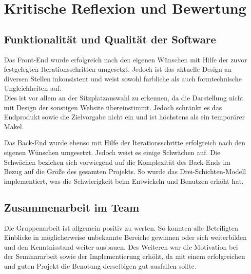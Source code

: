 \section{Kritische Reflexion und Bewertung}
\multipleauthorsection{\authorRF}{\authorEJ}

\subsection{Funktionalität und Qualität der Software}
\authorsection{\authorRF}

Das Front-End wurde erfolgreich nach den eigenen Wünschen mit Hilfe der zuvor festgelegten Iterationsschritten umgesetzt.
Jedoch ist das aktuelle Design an diversen Stellen inkonsistent und weist sowohl farbliche als auch formtechnische Ungleichheiten auf. \\
Dies ist vor allem an der Sitzplatzauswahl zu erkennen, da die Darstellung nicht mit Design der sonstigen Website übereinstimmt.
Jedoch schränkt es das Endprodukt sowie die Zielvorgabe nicht ein und ist höchstens als ein temporärer Makel.

Das Back-End wurde ebenso mit Hilfe der Iterationsschritte erfolgreich nach den eigenen Wünschen umgesetzt.
Jedoch weist es einige Schwächen auf.
Die Schwächen beziehen sich vorwiegend auf die Komplexität des Back-Ends im Bezug auf die Größe des gesamten Projekts.
So wurde das Drei-Schichten-Modell implementiert, was die Schwierigkeit beim Entwickeln und Benutzen erhöht hat.\\

\subsection{Zusammenarbeit im Team}
\multipleauthorsection{\authorRF}{\authorEJ}

Die Gruppenarbeit ist allgemein positiv zu werten. 
So konnten alle Beteiligten Einblicke in möglicherweise unbekannte Bereiche gewinnen oder sich weiterbilden und den Kenntnisstand weiter ausbauen.
Des Weiteren war die Motivation bei der Seminararbeit sowie der Implementierung erhöht, da mit einem erfolgreichen und guten Projekt die Benotung derselbigen gut ausfallen sollte.

